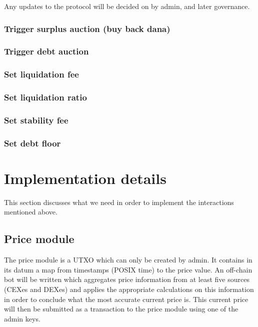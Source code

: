 \documentclass{article} %
\begin{document}
Any updates to the protocol will be decided on by admin, and later governance.

\subsubsection{Trigger surplus auction (buy back dana)}

\subsubsection{Trigger debt auction}

\subsubsection{Set liquidation fee}

\subsubsection{Set liquidation ratio}

\subsubsection{Set stability fee}

\subsubsection{Set debt floor}



\section{Implementation details}

This section discusses what we need in order to implement the interactions
mentioned above.

\subsection{Price module}

The price module is a UTXO which can only be created by admin.
It contains in its datum a map from timestamps (POSIX time) to the price value.
An off-chain bot will be written which aggregates price information from at
least five sources (CEXes and DEXes) and applies the appropriate calculations on
this information in order to conclude what the most accurate current price is.
This current price will then be submitted as a transaction to the price module
using one of the admin keys.
\end{document}
